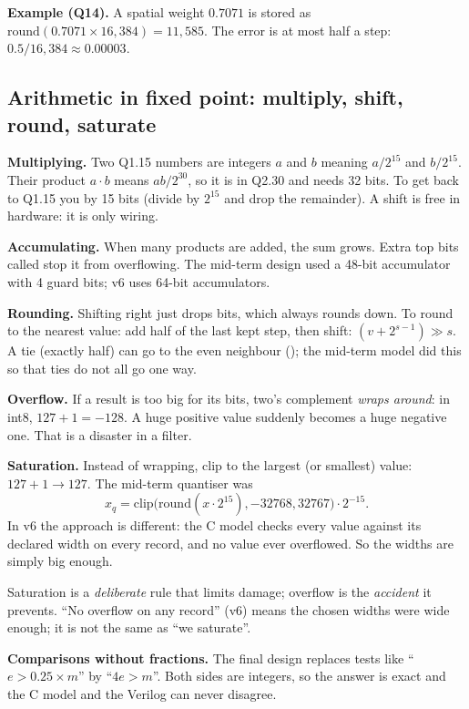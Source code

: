 \documentclass[11pt]{article}
\begin{document}
\textbf{Example (Q14).} A spatial weight $0.7071$ is stored as $\mathrm{round}(0.7071 \times 16{,}384) = 11{,}585$. The error is at most half a step: $0.5/16{,}384 \approx 0.00003$.

\subsection{Arithmetic in fixed point: multiply, shift, round, saturate}

\textbf{Multiplying.} Two Q1.15 numbers are integers $a$ and $b$ meaning $a/2^{15}$ and $b/2^{15}$. Their product $a\cdot b$ means $ab/2^{30}$, so it is in Q2.30 and needs 32 bits. To get back to Q1.15 you  by 15 bits (divide by $2^{15}$ and drop the remainder). A shift is free in hardware: it is only wiring.

\textbf{Accumulating.} When many products are added, the sum grows. Extra top bits called  stop it from overflowing. The mid-term design used a 48-bit accumulator with 4 guard bits; v6 uses 64-bit accumulators.

\textbf{Rounding.} Shifting right just drops bits, which always rounds down. To round to the nearest value: add half of the last kept step, then shift: $(v + 2^{s-1}) \gg s$. A tie (exactly half) can go to the even neighbour (); the mid-term model did this so that ties do not all go one way.

\textbf{Overflow.} If a result is too big for its bits, two's complement \emph{wraps around}: in int8, $127+1 = -128$. A huge positive value suddenly becomes a huge negative one. That is a disaster in a filter.

\textbf{Saturation.} Instead of wrapping, clip to the largest (or smallest) value: $127+1 \to 127$. The mid-term quantiser was
\[
x_q = \mathrm{clip}\big(\mathrm{round}(x\cdot 2^{15}), -32768, 32767\big)\cdot 2^{-15}.
\]
In v6 the approach is different: the C model checks every value against its declared width on every record, and no value ever overflowed. So the widths are simply big enough.

\begin{warn}
Saturation is a \emph{deliberate} rule that limits damage; overflow is the \emph{accident} it prevents. ``No overflow on any record'' (v6) means the chosen widths were wide enough; it is not the same as ``we saturate''.
\end{warn}

\textbf{Comparisons without fractions.} The final design replaces tests like ``$e > 0.25 \times m$'' by ``$4e > m$''. Both sides are integers, so the answer is exact and the C model and the Verilog can never disagree.
\end{document}
